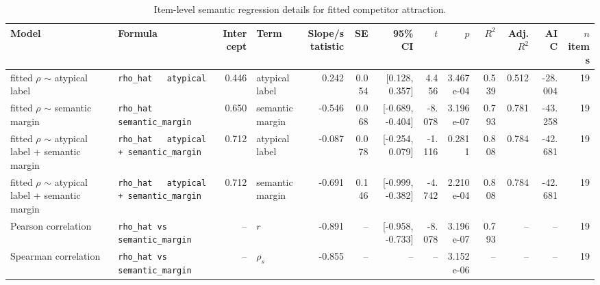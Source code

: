 \begin{table}[htbp]
\centering
\small
\caption{Item-level semantic regression details for fitted competitor attraction.}
\label{tab:semantic-regression-details}
\begin{tabular}{llrlrrrrrrrrr}
\toprule
Model & Formula & Intercept & Term & Slope/statistic & SE & 95\% CI & $t$ & $p$ & $R^2$ & Adj. $R^2$ & AIC & $n$ items \\
\midrule
fitted $\rho$ $\sim$ atypical label & \texttt{rho\_hat ~ atypical} & 0.446 & atypical label & 0.242 & 0.054 & [0.128, 0.357] & 4.456 & 3.467e-04 & 0.539 & 0.512 & -28.004 & 19 \\
fitted $\rho$ $\sim$ semantic margin & \texttt{rho\_hat ~ semantic\_margin} & 0.650 & semantic margin & -0.546 & 0.068 & [-0.689, -0.404] & -8.078 & 3.196e-07 & 0.793 & 0.781 & -43.258 & 19 \\
fitted $\rho$ $\sim$ atypical label + semantic margin & \texttt{rho\_hat ~ atypical + semantic\_margin} & 0.712 & atypical label & -0.087 & 0.078 & [-0.254, 0.079] & -1.116 & 0.2811 & 0.808 & 0.784 & -42.681 & 19 \\
fitted $\rho$ $\sim$ atypical label + semantic margin & \texttt{rho\_hat ~ atypical + semantic\_margin} & 0.712 & semantic margin & -0.691 & 0.146 & [-0.999, -0.382] & -4.742 & 2.210e-04 & 0.808 & 0.784 & -42.681 & 19 \\
Pearson correlation & \texttt{rho\_hat vs semantic\_margin} & -- & $r$ & -0.891 & -- & [-0.958, -0.733] & -8.078 & 3.196e-07 & 0.793 & -- & -- & 19 \\
Spearman correlation & \texttt{rho\_hat vs semantic\_margin} & -- & $\rho_s$ & -0.855 & -- & -- & -- & 3.152e-06 & -- & -- & -- & 19 \\
\bottomrule
\end{tabular}
\end{table}
